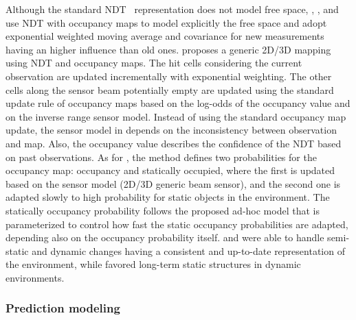 Although the standard NDT~\parencite{original:ndt} representation does not model free space, \cite{einhorn-gross:2013:6698849}, \cite{saarinen-et-al:2013:0278364913499415}, and \cite{einhorn-gross:2015:008} use NDT with occupancy maps to model explicitly the free space and adopt exponential weighted moving average and covariance for new measurements having an higher influence than old ones.
\cite{einhorn-gross:2015:008} proposes a generic 2D/3D mapping using NDT and occupancy maps. The hit cells considering the current observation are updated incrementally with exponential weighting. The other cells along the sensor beam potentially empty are updated using the standard update rule of occupancy maps based on the log-odds of the occupancy value and on the inverse range sensor model.
Instead of using the standard occupancy map update, the sensor model in \cite{saarinen-et-al:2013:0278364913499415} depends on the inconsistency between observation and map. Also, the occupancy value describes the confidence of the NDT based on past observations.
As for \cite{einhorn-gross:2015:008}, the method defines two probabilities for the occupancy map: occupancy and statically occupied, where the first is updated based on the sensor model (2D/3D generic beam sensor), and the second one is adapted slowly to high probability for static objects in the environment. The statically occupancy probability follows the proposed ad-hoc model that is parameterized to control how fast the static occupancy probabilities are adapted, depending also on the occupancy probability itself.
\cite{einhorn-gross:2013:6698849} and \cite{einhorn-gross:2015:008} were able to handle semi-static and dynamic changes having a consistent and up-to-date representation of the environment, while \cite{saarinen-et-al:2013:0278364913499415} favored long-term static structures in dynamic environments.



\subsubsection{Prediction modeling}

